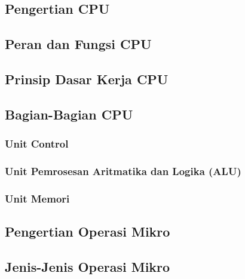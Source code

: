 \documentclass[12pt,a4paper]{article}
\begin{document}
    \subsection{Pengertian CPU}
    

    \subsection{Peran dan Fungsi CPU}
    

    \subsection{Prinsip Dasar Kerja CPU}
      

    \subsection{Bagian-Bagian CPU}
      

      \subsubsection{Unit Control}
        

      \subsubsection{Unit Pemrosesan Aritmatika dan Logika (ALU)}
        

      \subsubsection{Unit Memori}
        

    \subsection{Pengertian Operasi Mikro}
        

    \subsection{Jenis-Jenis Operasi Mikro}
        

  \newpage
\end{document}
